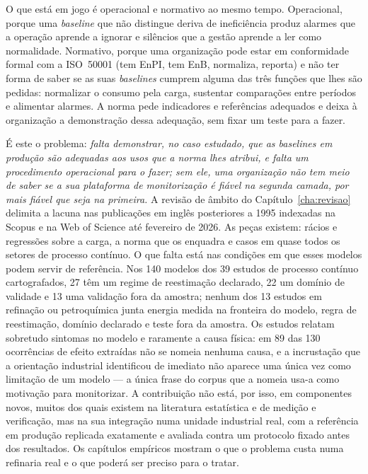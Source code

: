 O que está em jogo é operacional e normativo ao mesmo tempo.
Operacional, porque uma \emph{baseline} que não distingue deriva de
ineficiência produz alarmes que a operação aprende a ignorar e
silêncios que a gestão aprende a ler como normalidade. Normativo, porque
uma organização pode estar em conformidade formal com a ISO~50001 (tem
EnPI, tem EnB, normaliza, reporta) e não ter forma de saber se as
suas \emph{baselines} cumprem alguma das três funções que lhes são
pedidas: normalizar o consumo pela carga, sustentar comparações entre
períodos e alimentar alarmes. A norma pede indicadores e referências
adequados e deixa à organização a demonstração dessa adequação, sem fixar
um teste para a fazer.

É este o problema: \emph{falta demonstrar, no caso estudado, que as
\emph{baselines} em produção são adequadas aos usos que a norma lhes
atribui, e falta um procedimento operacional para o fazer; sem ele, uma
organização não tem meio de saber se a sua plataforma de monitorização é
fiável na segunda camada, por mais fiável que seja na primeira.} A
revisão de âmbito do Capítulo~\ref{cha:revisao} delimita a lacuna nas
publicações em inglês posteriores a 1995 indexadas na Scopus e na Web of
Science até fevereiro de 2026. As peças existem: rácios e regressões sobre a
carga, a norma que os enquadra e casos em quase todos os setores de processo
contínuo. O que falta está nas condições em que esses modelos podem servir
de referência. Nos 140 modelos dos 39 estudos de processo contínuo
cartografados, 27 têm um regime de reestimação declarado, 22 um domínio de
validade e 13 uma validação fora da amostra; nenhum dos 13 estudos em
refinação ou petroquímica junta energia medida na fronteira do modelo,
regra de reestimação, domínio declarado e teste fora da amostra. Os estudos
relatam sobretudo sintomas no modelo e raramente a causa física: em 89 das
130 ocorrências de efeito extraídas não se nomeia nenhuma causa, e a
incrustação que a orientação industrial identificou de imediato não aparece
uma única vez como limitação de um modelo --- a única frase do corpus que a
nomeia usa-a como motivação para monitorizar. A contribuição não está, por isso,
em componentes novos, muitos dos quais existem na literatura estatística e
de medição e verificação, mas na sua integração numa unidade industrial
real, com a referência em produção replicada exatamente e avaliada contra um
protocolo fixado antes dos resultados. Os capítulos empíricos mostram o que
o problema custa numa refinaria real e o que poderá ser preciso para o tratar.

